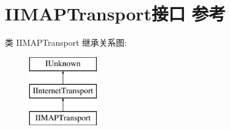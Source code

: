 \hypertarget{class_i_i_m_a_p_transport}{}\section{I\+I\+M\+A\+P\+Transport接口 参考}
\label{class_i_i_m_a_p_transport}
类 I\+I\+M\+A\+P\+Transport 继承关系图\+:\begin{figure}[H]
\begin{center}
\leavevmode
\includegraphics[height=3.000000cm]{class_i_i_m_a_p_transport}
\end{center}
\end{figure}

